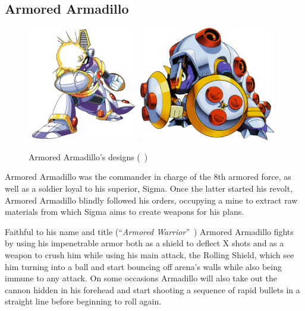 \subsection{Armored Armadillo}\label{boss:Armored_Armadillo}
\begin{figure}[htp]
	\centering
	\includegraphics[height=5cm]{figures/X1/Armored_armadillo/Armored_armadillo.jpg}
	\includegraphics[height=5cm]{figures/X1/Armored_armadillo/MHXArmoredArmadillo.png}
	\caption{Armored Armadillo's designs (~\cite{book:MMX_Complete_art})}
\end{figure}
Armored Armadillo was the commander in charge of the 8th armored force, as well as a soldier loyal to his superior, Sigma. Once the latter started his revolt, Armored Armadillo blindly followed his orders, occupying a mine to extract raw materials from which Sigma aims to create weapons for his plans.

Faithful to his name and title (``\textit{Armored Warrior}''~\cite{book:MMX_Complete_art}) Armored Armadillo fights by using his impenetrable armor both as a shield to deflect X shots and as a weapon to crush him while using his main attack, the Rolling Shield, which see him turning into a ball and start bouncing off arena's walls while also being immune to any attack. On some occasions Armadillo will also take out the cannon hidden in his forehead and start shooting a sequence of rapid bullets in a straight line before beginning to roll again. 

